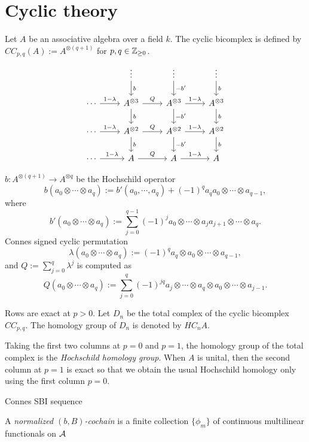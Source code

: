 \documentclass{../../large}
\begin{document}
\chapter{Cyclic theory}



Let $A$ be an associative algebra over a field $k$.
The cyclic bicomplex is defined by $CC_{p,q}(A):=A^{\otimes(q+1)}$ for $p,q\in\mathbb{Z}_{\ge0}$.
\[\begin{tikzcd}
&\vdots\dar{b}&\vdots\dar{-b'}&\vdots\dar{b}\\
\cdots\rar{1-\lambda}&A^{\otimes3} \rar{Q}\dar{b} & A^{\otimes3} \rar{1-\lambda}\dar{-b'} & A^{\otimes3} \dar{b}\\
\cdots\rar{1-\lambda}&A^{\otimes2} \rar{Q}\dar{b} & A^{\otimes2} \rar{1-\lambda}\dar{-b'} & A^{\otimes2} \dar{b}\\
\cdots\rar{1-\lambda}&A \rar{Q} & A \rar{1-\lambda} & A
\end{tikzcd}\]

$b:A^{\otimes(q+1)}\to A^{\otimes q}$ be the Hochschild operator
\[b(a_0\otimes\cdots\otimes a_q):=b'(a_0,\cdots,a_q)+(-1)^qa_qa_0\otimes\cdots\otimes a_{q-1},\]
where
\[b'(a_0\otimes\cdots\otimes a_q):=\sum_{j=0}^{q-1}(-1)^ja_0\otimes\cdots\otimes a_ja_{j+1}\otimes\cdots\otimes a_q.\]
Connes signed cyclic permutation
\[\lambda(a_0\otimes\cdots\otimes a_q):=(-1)^qa_q\otimes a_0\otimes\cdots\otimes a_{q-1},\]
and $Q:=\sum_{j=0}^q\lambda^j$ is computed as
\[Q(a_0\otimes\cdots\otimes a_q):=\sum_{j=0}^q(-1)^{jq}a_j\otimes\cdots\otimes a_q\otimes a_0\otimes\cdots\otimes a_{j-1}.\]


Rows are exact at $p>0$.
Let $D_n$ be the total complex of the cyclic bicomplex $CC_{p,q}$.
The homology group of $D_n$ is denoted by $HC_nA$.

Taking the first two columns at $p=0$ and $p=1$, the homology group of the total complex is the \emph{Hochschild homology group}.
When $A$ is unital, then the second column at $p=1$ is exact so that we obtain the usual Hochschild homology only using the first column $p=0$.



Connes SBI sequence


A \emph{normalized $(b,B)$-cochain} is a finite collection $\{\phi_m\}$ of continuous multilinear functionals on $\mathcal{A}$









\chapter{}
\end{document}
